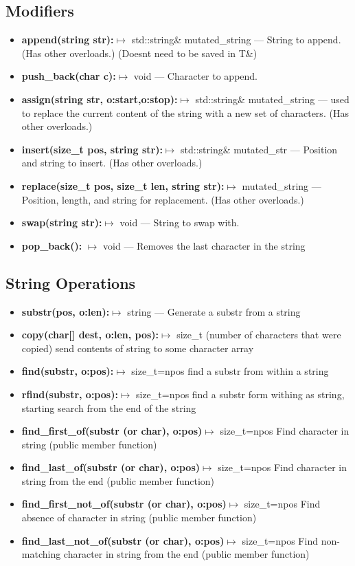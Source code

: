 \documentclass{report}
\begin{document}
    \subsection{Modifiers}
    \begin{itemize}
        \item \textbf{append(string str):}$\mapsto$ std::string\& mutated\_string --- String to append. (Has other overloads.) (Doesnt need to be saved in T\&)
        \item \textbf{push\_back(char c):}$\mapsto$ void --- Character to append.
        \item \textbf{assign(string str, o:start,o:stop):}$\mapsto$ std::string\& mutated\_string  --- used to replace the current content of the string with a new set of characters. (Has other overloads.)
        \item \textbf{insert(size\_t pos, string str):}$\mapsto$ std::string& mutated\_str --- Position and string to insert. (Has other overloads.)
        \item \textbf{replace(size\_t pos, size\_t len, string str):}$\mapsto $ mutated\_string --- Position, length, and string for replacement. (Has other overloads.)
        \item \textbf{swap(string str):}$\mapsto$ void --- String to swap with.
        \item \textbf{pop\_back():} $\mapsto$ void --- Removes the last character in the string
    \end{itemize}

    \pagebreak \bigbreak \noindent 
    \subsection{String Operations}
    \begin{itemize}
        \item \textbf{substr(pos, o:len):}$\mapsto$ string --- Generate a substr from a string 
        \item \textbf{copy(char[] dest, o:len, pos):}$\mapsto$ size\_t (number of characters that were copied) send contents of string to some character array
        \item \textbf{find(substr, o:pos):}$\mapsto$ size\_t=npos find a substr from within a string
        \item \textbf{rfind(substr, o:pos):}$\mapsto$ size\_t=npos  find a substr form withing as string, starting search from the end of the string
        \item \textbf{find\_first\_of(substr (or char), o:pos)}$\mapsto$ size\_t=npos Find character in string (public member function)
        \item \textbf{find\_last\_of(substr (or char), o:pos)}$\mapsto$ size\_t=npos	Find character in string from the end (public member function)
        \item \textbf{find\_first\_not\_of(substr (or char), o:pos)}$\mapsto$ size\_t=npos	Find absence of character in string (public member function)
        \item \textbf{find\_last\_not\_of(substr (or char), o:pos)}$\mapsto$ size\_t=npos	Find non-matching character in string from the end (public member function)
    \end{itemize}
    \bigbreak \noindent 
\end{document}
